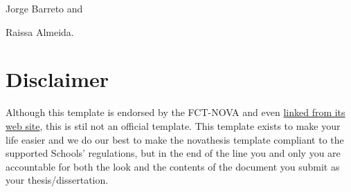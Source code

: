 \begin{inparaitem}[]
  \item Jorge Barreto and
  \item Raissa Almeida.  
\end{inparaitem}



\section{Disclaimer}
\label{sec:disclaimer}

Although this template is endorsed by the FCT-NOVA and even \href{https://www.fct.unl.pt/estudante/informacao-academica}{linked from its web site}, this is stil not an official template.
%
This template exists to make your life easier and we do our best to make the \gls{novathesis} template compliant to the supported Schools' regulations, but in the end of the line you and only you are accountable for both the look and the contents of the document you submit as your thesis/dissertation.
